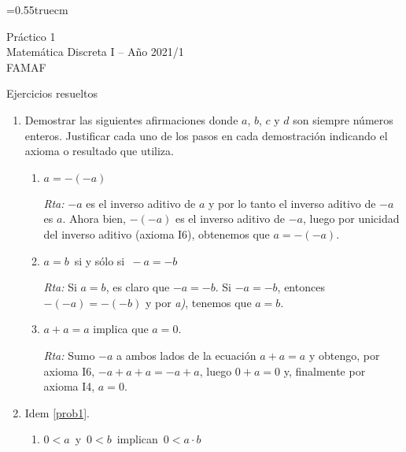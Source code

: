 \documentclass[a4paper,12pt,twoside,spanish,reqno]{amsbook}
\numberwithin{equation}{section}
\newcommand{\rta}{\noindent\textit{Rta: }}
\begin{document}
    \baselineskip=0.55truecm %
    

    
    
    {\bf \begin{center} Práctico 1 \\ Matemática Discreta I -- Año 2021/1 \\ FAMAF \end{center}}
    
    {\bf \begin{center} Ejercicios resueltos \end{center}}
    
    
    
    \begin{enumerate}
    \setlength\itemsep{1.1em}
        
        \item\label{prob1} Demostrar las siguientes afirmaciones donde $a$, $b$, $c$ y $d$ son siempre números enteros. Justificar cada uno de los pasos en cada demostración indicando el axioma o resultado que utiliza.
        \begin{enumerate}
            \item  $a=-(-a)$
            
            \rta $-a$  es el inverso aditivo de $a$ y por lo tanto el inverso aditivo de $-a$ es $a$.  Ahora bien, $-(-a)$  es el inverso aditivo de  $-a$, luego por  unicidad del inverso aditivo (axioma { I6}), obtenemos que $a = -(-a)$.
            
            \item  $a=b\,$ si y sólo si $\,-a=-b$
            
            \rta Si  $a=b$, es claro que $-a=-b$. Si $-a= -b$, entonces $-(-a) = -(-b)$ y  por \textit{a)}, tenemos que $a=b$.  
            
            \item  $a+a=a$ implica que  $a=0$.
            
            \rta Sumo $-a$ a ambos lados de la ecuación  $a+a=a$ y obtengo, por axioma I6,  $-a + a + a = -a +a$, luego $0 +a = 0$ y, finalmente por axioma I4, $a=0$. 
            
        \end{enumerate}
        
    
        
        \item Idem \ref{prob1}.
        
        \begin{enumerate}
            \item $0<a\,$ y $\,0<b\,$ implican $\,0<a\cdot b$
            

\end{enumerate}
\end{enumerate}
\end{document}
